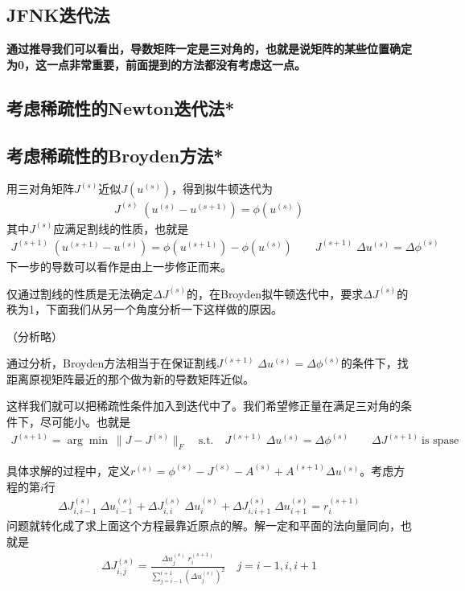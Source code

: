 \documentclass[12pt,a4paper]{article}
\begin{document}
\subsection*{JFNK迭代法}

\textbf{通过推导我们可以看出，导数矩阵一定是三对角的，也就是说矩阵的某些位置确定为0，这一点非常重要，前面提到的方法都没有考虑这一点。}

\subsection*{考虑稀疏性的Newton迭代法*}

\subsection*{考虑稀疏性的Broyden方法*}

用三对角矩阵$J^{(s)}$近似$J(u^{(s)})$，得到拟牛顿迭代为
\begin{align*}
J^{(s)} \; (u^{(s)} - u^{(s+1)}) = \phi(u^{(s)})
\end{align*}
其中$J^{(s)}$应满足割线的性质，也就是
\begin{align*}
J^{(s+1)} \; (u^{(s+1)} - u^{(s)}) = \phi(u^{(s+1)}) - \phi(u^{(s)}) \qquad J^{(s+1)} \; \Delta u^{(s)} = \Delta \phi^{(s)}
\end{align*}
下一步的导数可以看作是由上一步修正而来。

仅通过割线的性质是无法确定$\Delta J^{(s)}$的，在Broyden拟牛顿迭代中，要求$\Delta J^{(s)}$的秩为1，下面我们从另一个角度分析一下这样做的原因。

（分析略）

通过分析，Broyden方法相当于在保证割线$J^{(s+1)} \; \Delta u^{(s)} = \Delta \phi^{(s)}$的条件下，找距离原视矩阵最近的那个做为新的导数矩阵近似。

这样我们就可以把稀疏性条件加入到迭代中了。我们希望修正量在满足三对角的条件下，尽可能小。也就是
\begin{align*}
J^{(s+1)} = \arg \min \ \|J - J^{(s)}\|_F \quad \text{s.t.} \quad J^{(s+1)} \; \Delta u^{(s)} = \Delta \phi^{(s)} \qquad \Delta J^{(s+1)} \ \text{is spase}
\end{align*}

具体求解的过程中，定义$r^{(s)} = \phi^{(s)} - J^{(s)} - A^{(s)} + A^{(s+1)} \Delta u^{(s)}$。考虑方程的第$i$行
\begin{align*}
\Delta J^{(s)}_{i,i-1} \; \Delta u^{(s)}_{i-1} + \Delta J^{(s)}_{i,i} \; \Delta u^{(s)}_{i} + \Delta J^{(s)}_{i,i+1} \; \Delta u^{(s)}_{i+1} = r^{(s+1)}_{i}
\end{align*}
问题就转化成了求上面这个方程最靠近原点的解。解一定和平面的法向量同向，也就是
\begin{align*}
\Delta J^{(s)}_{i,j} = \frac{\Delta u^{(s)}_{j} \; r^{(s+1)}_{i}}{\sum_{j=i-1}^{i+1} (\Delta u^{(s)}_{j})^2} \quad j = i-1,i,i+1
\end{align*}
\end{document}
